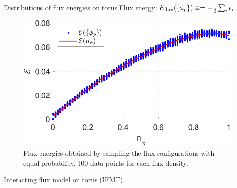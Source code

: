 \begin{frame}{Distributions of flux energies on torus}
    Flux energy: $E_{\textmd{flux}}(\left\{\phi_p\right\}) \equiv = -\frac{1}{2} \sum_i \epsilon_i$
    
    \begin{figure}
        \centering
        \begin{minipage}[c]{.6\textwidth}
            \includegraphics[width = 1\textwidth]{figures/24_6_tor.pdf}
        \end{minipage}
        \caption{Flux energies obtained by sampling the flux configurations with equal probability. 100 data points for each flux density.}
    \end{figure}
    Interacting flux model on torus (IFMT).

\end{frame}

